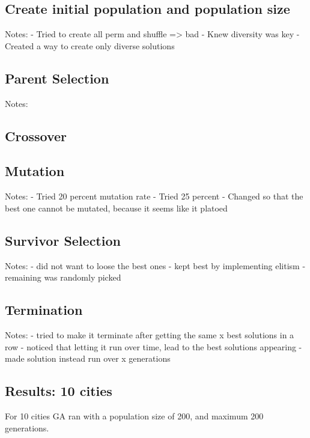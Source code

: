 \documentclass{article}
\begin{document}
    \subsection{Create initial population and population size}

    Notes: 
    - Tried to create all perm and shuffle => bad
    - Knew diversity was key
    - Created a way to create only diverse solutions
    \subsection{Parent Selection}

    Notes:

    \subsection{Crossover}

    \subsection{Mutation}

    Notes:
    - Tried 20 percent mutation rate 
    - Tried 25 percent 
    - Changed so that the best one cannot be mutated, because it seems like it platoed 

    \subsection{Survivor Selection}

    Notes:
    - did not want to loose the best ones
    - kept best by implementing elitism
    - remaining was randomly picked  

    \subsection{Termination}

    Notes: 
    - tried to make it terminate after getting the same x best solutions in a row
    - noticed that letting it run over time, lead to the best solutions appearing 
    - made solution instead run over x generations 

    \newpage

    \subsection{Results: 10 cities}

    For 10 cities GA ran with a population size of 200, and maximum 200 generations.
\end{document}
